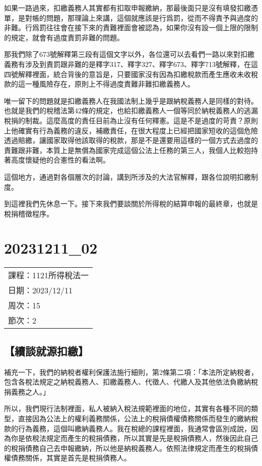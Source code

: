 \documentclass[]{ctexbook}
\begin{document}
如果一路過來，扣繳義務人其實都有扣取申報繳納，那最後面只是沒有填發扣繳憑單，是對帳的問題，那理論上來講，這個就應該是行爲罰，從而不得責予與過度的非難。行爲罰往往會在接下來的責難裡面會被認為，如果你沒有設一個上限的限制的規定，就會有過度責罰非難的問題。

那我們除了673號解釋第三段有這個文字以外，各位還可以去看們一路以來對扣繳義務有涉及到責罰跟非難的是釋字317、釋字327、釋字673、釋字713號解釋，在這四號解釋裡面，統合背後的意旨是，只要國家沒有因為扣繳稅款而產生應收未收稅款的這一種風險存在，原則上不得過度責難非難扣繳義務人。

唯一留下的問題就是扣繳義務人在我國法制上幾乎是跟納稅義務人是同樣的對待。也就是我們的稅稽法第42條的規定，也給扣繳義務人一個等同於納稅義務人的逃漏稅捐的制裁。這麼高度的責任目前為止沒有任何釋憲。這是不是過度的苛責？原則上他確實有行為義務的違反，補繳責任，在很大程度上已經把國家短收的這個危險透過賠繳，讓國家取得他該取得的稅款，那是不是還要用這樣的一個方式去過度的責難跟非難，本質上是無償為國家完成這個公法上任務的第三人，我個人比較抱持著高度懷疑他的合憲性的看法啊。

這個地方，通過對各個層次的討論，講到所涉及的大法官解釋，跟各位說明扣繳制度。

到這裡我們先休息一下。接下來我們要談關於所得稅的結算申報的最終章，也就是稅捐稽徵程序。

\hypertarget{section-28}{%
\chapter{20231211\_02}\label{section-28}}

\begin{longtable}[]{@{}l@{}}
\toprule()
\endhead
課程：1121所得稅法一 \\
日期：2023/12/11 \\
周次：15 \\
節次：2 \\
\bottomrule()
\end{longtable}

\hypertarget{ux7e8cux8ac7ux5c31ux6e90ux6263ux7e73}{%
\section{【續談就源扣繳】}\label{ux7e8cux8ac7ux5c31ux6e90ux6263ux7e73}}

補充一下，我們的納稅者權利保護法施行細則，第2條第二項：「本法所定納稅者，包含各稅法規定之納稅義務人、扣繳義務人、代徵人、代繳人及其他依法負繳納稅捐義務之人。」

所以，我們現行法制裡面，私人被納入稅法規範裡面的地位，其實有各種不同的類型，直接因為公法上的權利義務關係，公法上的稅捐債權債務關係而發生的繳納稅款的行為義務，這個叫繳納義務人。我在稅總的課程裡面，我通常會區別成說，因為你是依稅法規定而產生的稅捐債務，所以其實是先是稅捐債務人，然後因此自己的稅捐債務自己去申報繳納，所以他是納稅義務人。依照法律規定而產生的稅捐債權債務關係，其實是首先是稅捐債務人。
\end{document}
